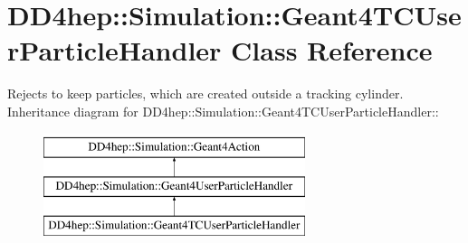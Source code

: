 \hypertarget{class_d_d4hep_1_1_simulation_1_1_geant4_t_c_user_particle_handler}{
\section{DD4hep::Simulation::Geant4TCUserParticleHandler Class Reference}
\label{class_d_d4hep_1_1_simulation_1_1_geant4_t_c_user_particle_handler}
}


Rejects to keep particles, which are created outside a tracking cylinder.  
Inheritance diagram for DD4hep::Simulation::Geant4TCUserParticleHandler::\begin{figure}[H]
\begin{center}
\leavevmode
\includegraphics[height=3cm]{class_d_d4hep_1_1_simulation_1_1_geant4_t_c_user_particle_handler}
\end{center}
\end{figure}
